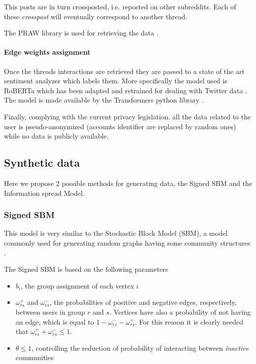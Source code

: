 This posts are in turn crossposted, i.e. reposted on other subreddits. Each of
these \emph{crosspost} will eventually correspond to another thread.

The PRAW library is used for retrieving the data \cite{praw}.

\paragraph{Edge weights assignment}%
\label{par:assigning_edge_weights}

Once the threads interactions are retrieved they are passed to a state of the
art sentiment analyzer which labels them. More specifically the model used is
RoBERTa which has been adapted and retrained for dealing with Twitter
data \cite{Barbieri2020}. The model is made available by the Transformers
python library \cite{wolf-etal-2020-transformers}.

\bigskip

Finally, complying with the current privacy legislation, all the data related
to the user is pseudo-anonymized (accounts identifier are replaced by random
ones) while no data is publicly available.

\subsection{Synthetic data}%
\label{sub:synthetic_data}

Here we propose $2$ possible methods for generating data, the Signed SBM and
the Information spread Model.

\subsubsection{Signed SBM}%
\label{ssub:signed_sbm}

This model is very similar to the Stochastic Block Model (SBM), a model
commonly used for generating random graphs having some community structures
\cite{Newman2018}.

The Signed SBM is based on the following parameters
\begin{itemize}
	\item $b_{i} $, the group assignment of each vertex $i$
	\item $\omega ^{+} _{rs} $ and $\omega ^{-} _{rs} $, the probabilities
	      of positive and negative edges, respectively, between users in
	      group $r$ and $s$. Vertices have also a probability of not having an
	      edge, which is equal to $1 - \omega ^{-} _{rs} - \omega ^{+} _{rs} $.
	      For this reason it is clearly needed that $\omega ^{+} _{rs} + \omega ^{-} _{rs} \leq 1$.
	\item $\theta \leq 1$, controlling the reduction of probability of interacting
	      between \emph{inactive} communities
\end{itemize}


